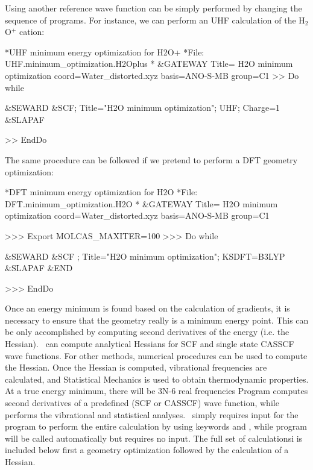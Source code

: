Using another reference wave function can be simply performed by changing the sequence of 
programs. For instance, we can perform an UHF calculation of the H$_2$O$^+$ 
cation:
  
\begin{inputlisting}
*UHF minimum energy optimization for H2O+
*File: UHF.minimum_optimization.H2Oplus
*
&GATEWAY 
 Title= H2O minimum optimization
 coord=Water_distorted.xyz
 basis=ANO-S-MB
 group=C1
>> Do while

 &SEWARD 
 &SCF; Title="H2O minimum optimization"; UHF; Charge=1
 &SLAPAF 

>> EndDo
\end{inputlisting}

The same procedure can be followed if we pretend to perform a DFT geometry optimization:

\begin{inputlisting}
*DFT minimum energy optimization for H2O
*File: DFT.minimum_optimization.H2O
*
&GATEWAY 
 Title= H2O minimum optimization
 coord=Water_distorted.xyz
 basis=ANO-S-MB
 group=C1

>>> Export MOLCAS_MAXITER=100
>>> Do while

 &SEWARD
 &SCF ; Title="H2O minimum optimization"; KSDFT=B3LYP
 &SLAPAF &END

>>> EndDo
\end{inputlisting}

Once an energy minimum is found based on the calculation of gradients, it is necessary to
ensure that the geometry really is a minimum energy point. This can be only 
accomplished by computing second derivatives of the energy (i.e. the Hessian). 
\molcas\ can compute analytical Hessians for SCF and single state
CASSCF wave functions. For other methods,  numerical procedures can be used 
to compute the Hessian. Once the Hessian is computed, vibrational
frequencies are calculated, and Statistical Mechanics is used to obtain thermodynamic 
properties. At a true energy minimum, there will be 3N-6 real frequencies 
Program  computes second derivatives 
of a predefined (SCF or CASSCF) wave function, while  performs 
the vibrational and statistical analyses. \molcas\ simply requires input for 
the  program to perform the entire calculation by using keywords
 and , while program  will be 
called automatically but requires no input. 
The full set of calculationsi is included below first a geometry optimization followed by the 
calculation of a Hessian.

